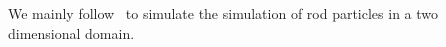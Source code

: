 We mainly follow~\cite{SED} to simulate the simulation of rod particles in a two dimensional domain.
\cite{BD}
